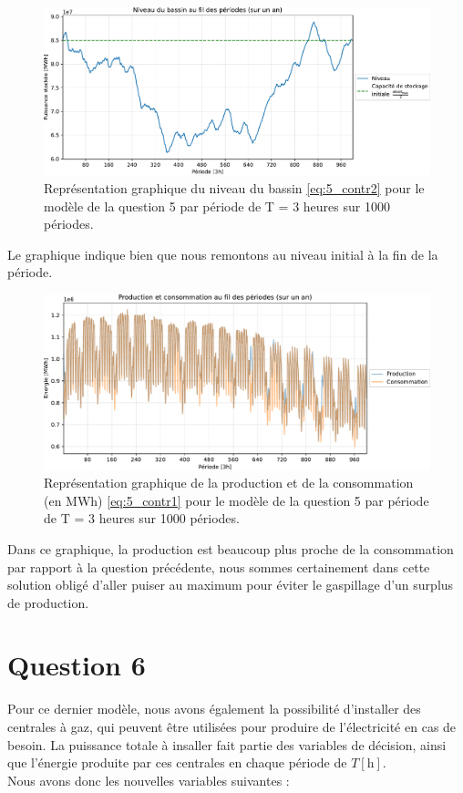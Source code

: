 \documentclass{article}
\newcommand{\unit}[1]{[\mathrm{#1}]}
\begin{document}
\begin{figure}[h!]
    \centering
    \includegraphics[scale=0.6]{GraphesP2/Niveau_Bassin_Q5.pdf}
    \caption{Représentation graphique du niveau du bassin \eqref{eq:5_contr2} pour le modèle 
    de la question 5 par période de T = 3 heures sur 1000 périodes.}
    \label{fig:Niveau_bassin_Q5}
\end{figure}
Le graphique indique bien que nous remontons au niveau initial à la fin de la période.
\newpage
\begin{figure}[h!]
    \centering
    \includegraphics[scale=0.6]{GraphesP2/Prod_Cons_Q5.pdf}
    \caption{Représentation graphique de la production et de la consommation (en MWh) 
    \eqref{eq:5_contr1} pour le modèle de la question 5 par période de T = 3 heures sur 1000 périodes.}
    \label{fig:Prod_Cons_Q5}
\end{figure}
Dans ce graphique, la production est beaucoup plus proche de la consommation par rapport à la question précédente, nous sommes certainement dans cette solution
obligé d'aller puiser au maximum pour éviter le gaspillage d'un surplus de production.
\noindent 

\newpage

\section*{Question 6}
Pour ce dernier modèle, nous avons également la possibilité d'installer des centrales à gaz, qui peuvent être utilisées pour produire de l'électricité en cas de besoin.
La puissance totale à insaller fait partie des variables de décision, ainsi que l'énergie produite par ces centrales en chaque période de $T \unit{h}$.\\
Nous avons donc les nouvelles variables suivantes :
\end{document}
